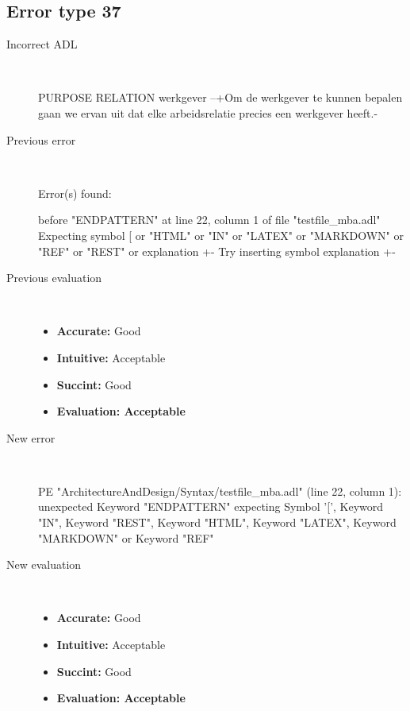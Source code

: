\subsection{Error type 37}
  \begin{description}
  \item[Incorrect ADL]~\\
\begin{adl}
PURPOSE RELATION werkgever
--{+Om de werkgever te kunnen bepalen gaan we ervan uit dat elke arbeidsrelatie precies een werkgever heeft.-}\end{adl}
  \item[Previous error]~\\
\begin{haskell}
Error(s) found:

before "ENDPATTERN" at line 22, column 1 of file "testfile_mba.adl"
Expecting symbol [ or "HTML" or "IN" or "LATEX" or "MARKDOWN" or "REF" or "REST"
 or explanation {+-}
Try inserting symbol explanation {+-}
\end{haskell}
  \item[Previous evaluation]~\\
    \begin{itemize}
    \item \textbf{Accurate:} Good
    \item \textbf{Intuitive:} Acceptable
    \item \textbf{Succint:} Good
    \item \textbf{Evaluation: Acceptable}
    \end{itemize}
  \item[New error]~\\
\begin{haskell}
PE "ArchitectureAndDesign/Syntax/testfile_mba.adl" (line 22, column 1):
unexpected Keyword "ENDPATTERN"
expecting Symbol '[', Keyword "IN", Keyword "REST", Keyword "HTML", Keyword "LATEX", Keyword "MARKDOWN" or Keyword "REF"\end{haskell}
  \item[New evaluation]~\\
    \begin{itemize}
    \item \textbf{Accurate:} Good
    \item \textbf{Intuitive:} Acceptable
    \item \textbf{Succint:} Good
    \item \textbf{Evaluation: Acceptable
}
    \end{itemize}
  \end{description}

